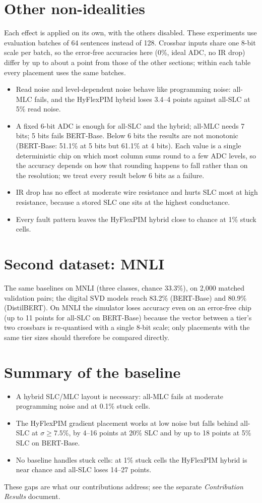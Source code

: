 \documentclass[10pt,a4paper]{article}
\begin{document}
\section{Other non-idealities}
Each effect is applied on its own, with the others disabled. These experiments use evaluation batches of 64
sentences instead of 128. Crossbar inputs share one 8-bit scale per batch, so the error-free accuracies here
(0\%, ideal ADC, no IR drop) differ by up to about a point from those of the other sections; within each table
every placement uses the same batches.

\begin{itemize}
\item Read noise and level-dependent noise behave like programming noise: all-MLC fails, and the HyFlexPIM
hybrid loses 3.4--4 points against all-SLC at 5\% read noise.
\item A fixed 6-bit ADC is enough for all-SLC and the hybrid; all-MLC needs 7 bits; 5 bits fails BERT-Base.
Below 6 bits the results are not monotonic (BERT-Base: 51.1\% at 5 bits but 61.1\% at 4 bits). Each value is
a single deterministic chip on which most column sums round to a few ADC levels, so the accuracy depends on
how that rounding happens to fall rather than on the resolution; we treat every result below 6 bits as a failure.
\item IR drop has no effect at moderate wire resistance and hurts SLC most at high resistance, because a stored
SLC one sits at the highest conductance.
\item Every fault pattern leaves the HyFlexPIM hybrid close to chance at 1\% stuck cells.
\end{itemize}

\section{Second dataset: MNLI}
The same baselines on MNLI (three classes, chance 33.3\%), on 2{,}000 matched validation pairs; the digital SVD
models reach 83.2\% (BERT-Base) and 80.9\% (DistilBERT). On MNLI the simulator loses accuracy even on an error-free
chip (up to 11 points for all-SLC on BERT-Base) because the vector between a tier's two crossbars is
re-quantised with a single 8-bit scale; only placements with the same tier sizes should therefore be compared
directly.


\section{Summary of the baseline}
\begin{itemize}
\item A hybrid SLC/MLC layout is necessary: all-MLC fails at moderate programming noise and at 0.1\% stuck cells.
\item The HyFlexPIM gradient placement works at low noise but falls behind all-SLC at $\sigma\geq7.5\%$, by 4--16
points at 20\% SLC and by up to 18 points at 5\% SLC on BERT-Base.
\item No baseline handles stuck cells: at 1\% stuck cells the HyFlexPIM hybrid is near chance and all-SLC loses
14--27 points.
\end{itemize}
These gaps are what our contributions address; see the separate \emph{Contribution Results} document.
\end{document}
